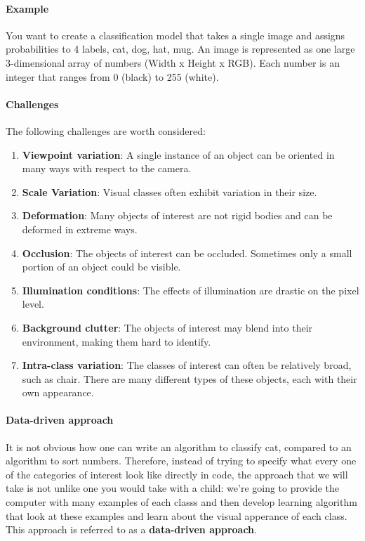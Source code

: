 \documentclass{article}
\begin{document}
\paragraph{Example} You want to create a classification model that takes a single image and assigns probabilities to 4 labels, {cat, dog, hat, mug}. An image is represented as one large 3-dimensional array of numbers (Width x Height x RGB). Each number is an integer that ranges from 0 (black) to 255 (white).

\paragraph{Challenges}
The following challenges are worth considered:
\begin{enumerate}
	\item \textbf{Viewpoint variation}: A single instance of an object can be oriented in many ways with respect to the camera. \\
	\item \textbf{Scale Variation}: Visual classes often exhibit variation in their size.\\
	\item \textbf{Deformation}: Many objects of interest are not rigid bodies and can be deformed in extreme ways. \\
    \item \textbf{Occlusion}: The objects of interest can be occluded. Sometimes only a small portion of an object could be visible. \\
    \item \textbf{Illumination conditions}: The effects of illumination are drastic on the pixel level. \\
    \item \textbf{Background clutter}: The objects of interest may blend into their environment, making them hard to identify. \\
    \item \textbf{Intra-class variation}: The classes of interest can often be relatively broad, such as chair. There are many different types of these objects, each with their own appearance.\\
\end{enumerate}

\paragraph{Data-driven approach} It is not obvious how one can write an algorithm to classify cat, compared to an algorithm to sort numbers. Therefore, instead of trying to specify what every one of the categories of interest look like directly in code, the approach that we will take is not unlike one you would take with a child: we're going to provide the computer with many examples of each classs and then develop learning algorithm that look at these examples and learn about the visual apperance of each class. This approach is referred to as a \textbf{data-driven approach}.
\end{document}
